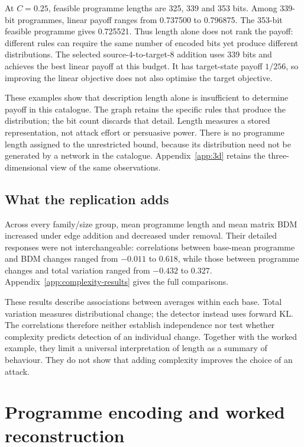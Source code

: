\documentclass[11pt,a4paper]{article}
\begin{document}
At $C=0.25$, feasible programme lengths are 325, 339 and 353 bits.
Among 339-bit programmes, linear payoff ranges from 0.737500 to 0.796875.
The 353-bit feasible programme gives 0.725521. Thus length alone does not
rank the payoff: different rules can require the same number of encoded
bits yet produce different distributions. The selected source-4-to-target-8
addition uses 339 bits and achieves the best linear payoff at this budget.
It has target-state payoff $1/256$, so improving the linear objective
does not also optimise the target objective.

These examples show that description length alone is insufficient to
determine payoff in this catalogue. The graph retains the specific rules
that produce the distribution; the bit count discards that detail.
Length measures a stored representation, not attack effort or persuasive
power. There is no programme length assigned to the unrestricted bound,
because its distribution need not be generated by a network in the
catalogue. Appendix~\ref{app:3d} retains the three-dimensional view of
the same observations.

\subsection{What the replication adds}
Across every family/size group, mean programme length and mean matrix BDM
increased under edge addition and decreased under removal. Their detailed
responses were not interchangeable: correlations between base-mean
programme and BDM changes ranged from $-0.011$ to $0.618$, while those
between programme changes and total variation ranged from $-0.432$ to
$0.327$. Appendix~\ref{app:complexity-results} gives the full comparisons.

These results describe associations between averages within each base.
Total variation measures distributional change; the detector instead uses
forward KL. The correlations therefore neither establish independence
nor test whether complexity predicts detection of an individual change.
Together with the worked example, they limit a universal interpretation
of length as a summary of behaviour. They do not show that adding
complexity improves the choice of an attack.

\section{Programme encoding and worked reconstruction}\label{app:encoding}
\end{document}
